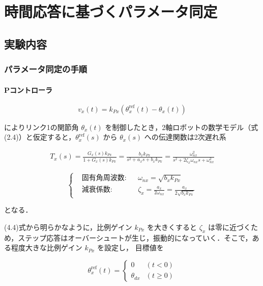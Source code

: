 \section{時間応答に基づくパラメータ同定}

\subsection{実験内容}
\subsubsection{パラメータ同定の手順}

\paragraph{Pコントローラ}

\begin{equation}
    v_x(t) = k_{Px}(\theta_x^{\mathrm{ref}}(t) - \theta_x(t)) \tag{4.2}
\end{equation}

によりリンク1の関節角 $\theta_x(t)$ を制御したとき，2軸ロボットの数学モデル（式(2.4)）と仮定すると，$\theta_x^{\mathrm{ref}}(s)$ から $\theta_x(s)$ への伝達関数は2次遅れ系

\begin{align}
    T_x(s) = \frac{G_x(s)k_{Px}}{1 + G_x(s)k_{Px}} = \frac{b_x k_{Px}}{s^2 + a_x s + b_x k_{Px}} = \frac{\omega_{nx}^2}{s^2 + 2 \zeta_x \omega_{nx} s + \omega_{nx}^2} \tag{4.3}
\end{align}

\[ 
\left\{
\begin{aligned}
    &\text{固有角周波数:} && \omega_{nx} = \sqrt{b_x k_{Px}} \\
    &\text{減衰係数:} && \zeta_x = \frac{a_x}{2 \omega_{nx}} = \frac{a_x}{2\sqrt{b_x k_{Px}}}
\end{aligned}
\right. \tag{4.4}
\]

となる．

(4.4)式から明らかなように，比例ゲイン $k_{Px}$ を大きくすると $\zeta_x$ は零に近づくため，ステップ応答はオーバーシュートが生じ，振動的になっていく．そこで，ある程度大きな比例ゲイン $k_{Px}$ を設定し，
目標値を

\begin{equation}
    \theta_x^{\mathrm{ref}}(t) = 
    \begin{cases}
        0 & (t < 0) \\
        \theta_{dx} & (t \geq 0)
    \end{cases} \tag{4.5}
\end{equation}

